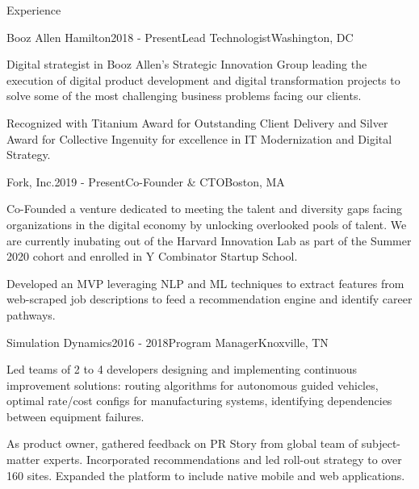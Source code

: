 \documentclass{resume} %
\begin{document}

\begin{rSection}{Experience}

\begin{rSubsection}{Booz Allen Hamilton}{2018 - Present}{Lead Technologist}{Washington, DC}
\item Digital strategist in Booz Allen's Strategic Innovation Group leading the execution of digital product development and digital transformation projects to solve some of the most challenging business problems facing our clients.
\item Recognized with Titanium Award for Outstanding Client Delivery and Silver Award for Collective Ingenuity for excellence in IT Modernization and Digital Strategy.

\end{rSubsection}


\begin{rSubsection}{Fork, Inc.}{2019 - Present}{Co-Founder \& CTO}{Boston, MA}
\item Co-Founded a venture dedicated to meeting the talent and diversity gaps facing organizations in the digital economy by unlocking overlooked pools of talent.  We are currently inubating out of the Harvard Innovation Lab as part of the Summer 2020 cohort and enrolled in Y Combinator Startup School.
\item Developed an MVP leveraging NLP and ML techniques to extract features from web-scraped job descriptions to feed a recommendation engine and identify career pathways.

\end{rSubsection}


\begin{rSubsection}{Simulation Dynamics}{2016 - 2018}{Program Manager}{Knoxville, TN}
\item Led teams of 2 to 4 developers designing and implementing continuous improvement solutions: routing algorithms for
autonomous guided vehicles, optimal
rate/cost configs for manufacturing systems, identifying dependencies between equipment failures.
\item As product owner, gathered feedback on PR Story from global team of subject-matter experts. Incorporated recommendations and
led roll-out strategy to over 160 sites. Expanded the platform to include native mobile and web applications.


\end{rSubsection}
\end{rSection}
\end{document}
